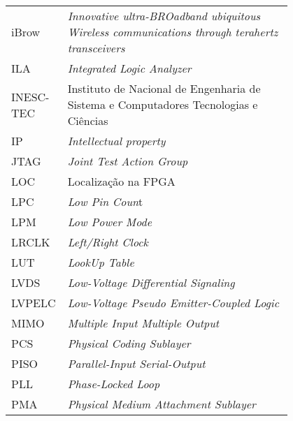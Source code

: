 \begin{flushleft}
\begin{longtable}{l p{0.8\linewidth}}
iBrow     & \textit{Innovative ultra-BROadband ubiquitous Wireless communications through terahertz transceivers} \\
ILA       & \textit{Integrated Logic Analyzer}                                                                    \\
INESC-TEC & Instituto de Nacional de Engenharia de Sistema e Computadores Tecnologias e Ciências         \\
IP        & \textit{Intellectual property  }                                                                      \\
JTAG      & \textit{Joint Test Action Group}                                                                      \\
LOC       & Localização na FPGA                                                                          \\
LPC       & \textit{Low Pin Coun}t                                                                                \\
LPM       & \textit{Low Power Mode }                                                                              \\
LRCLK     & \textit{Left/Right Clock}                                                                             \\
LUT       & \textit{LookUp Table }                                                                                \\
LVDS      & \textit{Low-Voltage Differential Signaling }                                                          \\
LVPELC    & \textit{Low-Voltage Pseudo Emitter-Coupled Logic}                                                     \\
MIMO      & \textit{Multiple Input Multiple Output }                                                              \\
PCS       & \textit{Physical Coding Sublayer}                                                                     \\
PISO      & \textit{Parallel-Input Serial-Output }                                                                \\
PLL       & \textit{Phase-Locked Loop}                                                                            \\
PMA       & \textit{Physical Medium Attachment Sublayer }                                                         \\

\end{longtable}
\end{flushleft}
